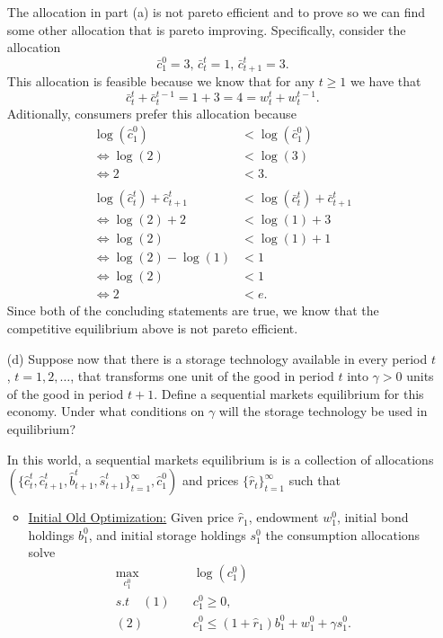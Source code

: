 \documentclass[11pt,english]{article}
\begin{document}
\begin{enumerate}
\begin{solution}
The allocation in part (a) is not pareto efficient and to prove so we can find some other allocation that is pareto improving. Specifically, consider the allocation $$\bar{c}_1^0 = 3,\, \bar{c}_t^t = 1,\, \bar{c}_{t+1}^t = 3.$$ This allocation is feasible because we know that for any $t\geq 1$ we have that $$\bar{c}_t^t + \bar{c}_{t}^{t-1} = 1 + 3 = 4 = w_t^t + w_{t}^{t-1}.$$Aditionally, consumers prefer this allocation because 
\begin{align*}
\log(\hat{c}_1^0) &< \log(\bar{c}_1^0)\\
\Longleftrightarrow \log(2) &< \log(3)\\
\Longleftrightarrow 2 &< 3.\\\\
\log(\hat{c}_t^t) + \hat{c}_{t+1}^t &< \log(\bar{c}_t^t) + \bar{c}_{t+1}^t\\
\Longleftrightarrow \log(2) + 2 &< \log(1) + 3\\
\Longleftrightarrow \log(2) &< \log(1) + 1\\
\Longleftrightarrow \log(2) - \log(1)&< 1\\
\Longleftrightarrow \log(2) &< 1\\
\Longleftrightarrow 2 &< e.
\end{align*}
Since both of the concluding statements are true, we know that the competitive equilibrium above is not pareto efficient.
    \end{solution}
 
    \item[(d)] Suppose now that there is a storage technology available in every
        period $t$, $t = 1, 2, \ldots$, that transforms one unit of the good in
        period $t$ into $\gamma > 0$ units of the good in period $t+1$. Define
        a sequential markets equilibrium for this economy. Under what conditions
        on $\gamma$ will the storage technology be used in equilibrium?
    \begin{solution}
 In this world, a sequential markets equilibrium is is a collection of allocations $\left(\{\hat{c}_t^t, \hat{c}_{t+1}^t, \hat{b}_{t+1}^t, \hat{s}_{t+1}^t\}_{t=1}^\infty, \hat{c}_1^0\right)$ and prices $\{\hat{r}_t\}_{t=1}^\infty$ such that
\begin{itemize}
\item \underline{Initial Old Optimization:} Given price $\hat{r}_1$, endowment $w_1^0$, initial bond holdings $b_1^0$, and initial storage holdings $s_1^0$ the consumption allocations solve
\begin{align*}
\max_{c_1^0}&\quad \log(c_1^0)\\
s.t\quad (1)&\quad c_1^0 \geq 0,\\
(2)&\quad c_1^0 \leq (1+\hat{r}_1)b_1^0 + w_1^0 + \gamma s_1^0.
\end{align*}


\end{itemize}
\end{solution}
\end{enumerate}
\end{document}
